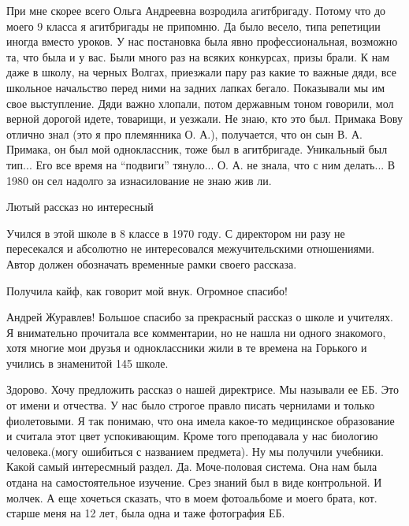 \begin{itemize}
\begin{itemize}
\begin{itemize}
\end{itemize} %


При мне скорее всего Ольга Андреевна возродила агитбригаду. Потому что до моего
9 класса я агитбригады не припомню. Да было весело, типа репетиции иногда
вместо уроков. У нас постановка была явно профессиональная, возможно та, что
была и у вас. Были много раз на всяких конкурсах, призы брали. К нам даже в
школу, на черных Волгах, приезжали пару раз какие то важные дяди, все школьное
начальство перед ними на задних лапках бегало. Показывали мы им свое
выступление. Дяди важно хлопали, потом державным тоном говорили, мол верной
дорогой идете, товарищи, и уезжали. Не знаю, кто это был. Примака Вову отлично
знал (это я про племянника О. А.), получается, что он сын В. А. Примака, он был
мой одноклассник, тоже был в агитбригаде. Уникальный был тип... Его все время
на \enquote{подвиги} тянуло... О. А. не знала, что с ним делать... В 1980 он сел
надолго за изнасилование не знаю жив ли.

\end{itemize} %

Лютый рассказ но интересный


Учился в этой школе в 8 классе в 1970 году. С директором ни разу не пересекался
и абсолютно не интересовался межучительскими отношениями. Автор должен
обозначать временные рамки своего рассказа.


Получила кайф, как говорит мой внук. Огромное спасибо!


Андрей Журавлев! Большое спасибо за прекрасный рассказ о школе и учителях. Я
внимательно прочитала все комментарии, но не нашла ни одного знакомого, хотя
многие мои друзья и одноклассники жили в те времена на Горького и учились в
знаменитой 145 школе.


Здорово. Хочу предложить рассказ о нашей директрисе. Мы называли ее ЕБ. Это от
имени и отчества. У нас было строгое правло писать чернилами и только
фиолетовыми. Я так понимаю, что она имела какое-то медицинское образование и
считала этот цвет успокивающим. Кроме того преподавала у нас биологию
человека.(могу ошибиться с названием предмета). Ну мы получили учебники. Какой
самый интересмный раздел. Да. Моче-половая система. Она нам была отдана на
самостоятельное изучение. Срез знаний был в виде контрольной. И молчек. А еще
хочеться сказать, что в моем фотоальбоме и моего брата, кот. старше меня на 12
лет, была одна и таже фотография ЕБ.


\end{itemize}
